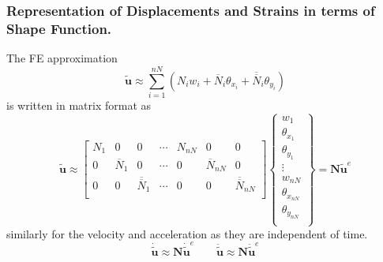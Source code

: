 \documentclass[9pt]{beamer}
\begin{document}
\begin{frame}
\frametitle{Representation of Displacements and Strains in terms of Shape Function.}
The FE approximation 
\begin{equation*}
\tilde{\mathbf{u}} \approx \sum_{i=1}^{nN}\left(N_iw_i+\overline{N}_i\theta_{x_i}+\overline{\overline{N}}_i\theta_{y_i}\right)
\end{equation*}
is written in matrix format as
\begin{equation*}
\tilde{\mathbf{u}} \approx 
\begin{bmatrix}
N_1 & 0 & 0  & \cdots & N_{nN} & 0 & 0 \\
0 & \overline{N}_1 & 0  & \cdots & 0 & \overline{N}_{nN} & 0 \\
0 & 0 & \overline{\overline{N}}_1 & \cdots & 0 & 0 & \overline{\overline{N}}_{nN} \\
\end{bmatrix}
\left\{
\begin{array}{r}
w_1 \\
\theta_{x_1} \\
\theta_{y_1} \\
\vdots \\
w_{nN} \\
\theta_{x_{nN}} \\
\theta_{y_{nN}} \\
\end{array} \right\}
=
\mathbf{N} \tilde{\mathbf{u}}^e 
\end{equation*}
similarly for the velocity and acceleration as they are independent of time.
\begin{equation}
\dot{\tilde{ \mathbf{ u}} } \approx \mathbf{N}  \dot{\tilde{\mathbf{u}}}^e
 \qquad  
\ddot{\tilde{ \mathbf{ u}} } \approx \mathbf{N}  \ddot{\tilde{\mathbf{u}}}^e
\end{equation}
\end{frame}
\end{document}
